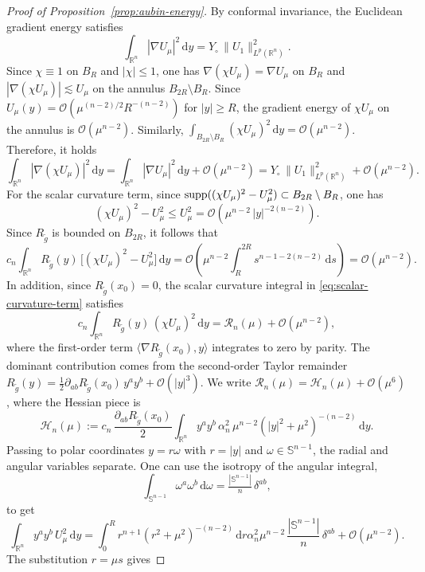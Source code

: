 \documentclass[reqno,11pt]{amsart}
\numberwithin{equation}{section}
\theoremstyle{definition}
\theoremstyle{remark}
\newcommand{\ud}{\,\mathrm{d}}
\newcommand{\R}{\mathbb{R}}
\newcommand{\Ss}{\mathbb{S}}
\begin{document}
\begin{proof}[Proof of Proposition~\ref{prop:aubin-energy}]
\smallskip
{} By conformal invariance, the Euclidean gradient energy satisfies
\[
\int_{\R^n} |\nabla U_\mu|^2 \ud y = Y_\circ\,\|U_1\|_{L^p(\R^n)}^2.
\]
Since $\chi \equiv 1$ on $B_R$ and $|\chi| \leqslant 1$, one has $\nabla(\chi U_\mu) = \nabla U_\mu$ on $B_R$ and $|\nabla(\chi U_\mu)| \lesssim U_\mu$ on the annulus $B_{2R} \setminus B_R$. Since $U_\mu(y) = \mathcal{O}(\mu^{(n-2)/2} R^{-(n-2)})$ for $|y| \geqslant R$, the gradient energy of $\chi U_\mu$ on the annulus is $\mathcal{O}(\mu^{n-2})$. Similarly, $\int_{B_{2R} \setminus B_R} (\chi U_\mu)^2 \ud y = \mathcal{O}(\mu^{n-2})$. Therefore, it holds
\[
\int_{\R^n} |\nabla(\chi U_\mu)|^2 \ud y = \int_{\R^n} |\nabla U_\mu|^2 \ud y + \mathcal{O}(\mu^{n-2}) = Y_\circ\,\|U_1\|_{L^p(\R^n)}^2 + \mathcal{O}(\mu^{n-2}).
\]
For the scalar curvature term, since ${\rm supp}((\chi U_\mu)^2 - U_\mu^2)\subset B_{2R} \setminus B_R$, one has
\[
(\chi U_\mu)^2 - U_\mu^2\leqslant U_\mu^2 = \mathcal{O}(\mu^{n-2}\,|y|^{-2(n-2)}).
\]
Since $R_{\tilde{g}}$ is bounded on $B_{2R}$, it follows that
\[
c_n \int_{\R^n} R_{\tilde{g}}(y)\,\bigl[(\chi U_\mu)^2 - U_\mu^2\bigr] \ud y = \mathcal{O}\!\left(\mu^{n-2} \int_R^{2R} s^{n-1-2(n-2)} \ud s\right) = \mathcal{O}(\mu^{n-2}).
\]
In addition, since $R_{\tilde{g}}(x_0) = 0$, the scalar curvature integral in \eqref{eq:scalar-curvature-term}
satisfies 
\[
c_n \int_{\R^n} R_{\tilde{g}}(y)\,(\chi U_\mu)^2 \ud y = \mathcal{R}_n(\mu) + \mathcal{O}(\mu^{n-2}),
\]
where the first-order term $\langle \nabla R_{\tilde{g}}(x_0), y \rangle$ integrates to zero by parity. The dominant contribution comes from the second-order Taylor remainder $R_{\tilde{g}}(y) = \tfrac{1}{2}\partial_{ab}R_{\tilde{g}}(x_0)\,y^a y^b + \mathcal{O}(|y|^3)$. We write $\mathcal{R}_n(\mu) = \mathcal{H}_n(\mu) + \mathcal{O}(\mu^6)$, where the Hessian piece is
\[
\mathcal{H}_n(\mu) := c_n\,\frac{\partial_{ab}R_{\tilde{g}}(x_0)}{2} \int_{\R^n} y^a y^b\, \alpha_n^2\,\mu^{n-2}(|y|^2 + \mu^2)^{-(n-2)} \ud y.
\]
Passing to polar coordinates $y = r\omega$ with $r = |y|$ and $\omega \in \Ss^{n-1}$, the radial and angular variables separate. One can use the isotropy of the angular integral,
\begin{equation}\label{eq:isotropy}
 \int_{\Ss^{n-1}} \omega^a\omega^b \ud\omega = \tfrac{|\Ss^{n-1}|}{n}\,\delta^{ab},   
\end{equation}
to get
\[
\int_{\R^n} y^a y^b\, U_\mu^2 \ud y
= \int_0^R r^{n+1}(r^2 + \mu^2)^{-(n-2)} \ud r \alpha_n^2\mu^{n-2}\,\frac{|\Ss^{n-1}|}{n}\,\delta^{ab} + \mathcal{O}(\mu^{n-2}).
\]
The substitution $r = \mu s$ gives

\end{proof}
\end{document}
